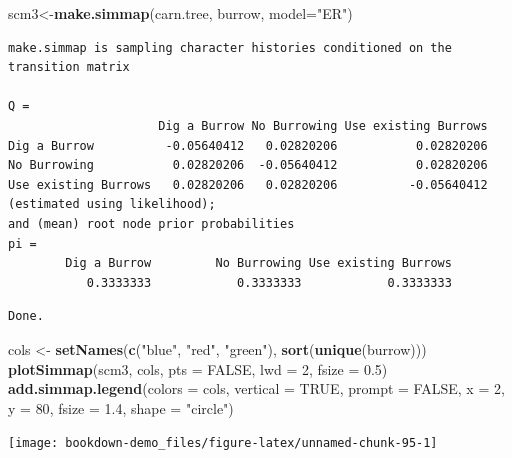 \documentclass[
]{book}
\newenvironment{Shaded}{\begin{snugshade}}{\end{snugshade}}
\newcommand{\DataTypeTok}[1]{\textcolor[rgb]{0.13,0.29,0.53}{#1}}
\newcommand{\DecValTok}[1]{\textcolor[rgb]{0.00,0.00,0.81}{#1}}
\newcommand{\FloatTok}[1]{\textcolor[rgb]{0.00,0.00,0.81}{#1}}
\newcommand{\KeywordTok}[1]{\textcolor[rgb]{0.13,0.29,0.53}{\textbf{#1}}}
\newcommand{\NormalTok}[1]{#1}
\newcommand{\OtherTok}[1]{\textcolor[rgb]{0.56,0.35,0.01}{#1}}
\newcommand{\StringTok}[1]{\textcolor[rgb]{0.31,0.60,0.02}{#1}}
\begin{document}
\begin{Shaded}
\begin{Highlighting}[]
\NormalTok{scm3\textless{}{-}}\KeywordTok{make.simmap}\NormalTok{(carn.tree, burrow, }\DataTypeTok{model=}\StringTok{"ER"}\NormalTok{)}
\end{Highlighting}
\end{Shaded}

\begin{verbatim}
make.simmap is sampling character histories conditioned on the transition matrix

Q =
                     Dig a Burrow No Burrowing Use existing Burrows
Dig a Burrow          -0.05640412   0.02820206           0.02820206
No Burrowing           0.02820206  -0.05640412           0.02820206
Use existing Burrows   0.02820206   0.02820206          -0.05640412
(estimated using likelihood);
and (mean) root node prior probabilities
pi =
        Dig a Burrow         No Burrowing Use existing Burrows 
           0.3333333            0.3333333            0.3333333 
\end{verbatim}

\begin{verbatim}
Done.
\end{verbatim}

\begin{Shaded}
\begin{Highlighting}[]
\NormalTok{cols \textless{}{-}}\StringTok{ }\KeywordTok{setNames}\NormalTok{(}\KeywordTok{c}\NormalTok{(}\StringTok{"blue"}\NormalTok{, }\StringTok{"red"}\NormalTok{, }\StringTok{"green"}\NormalTok{), }\KeywordTok{sort}\NormalTok{(}\KeywordTok{unique}\NormalTok{(burrow)))}
\KeywordTok{plotSimmap}\NormalTok{(scm3, cols, }\DataTypeTok{pts =} \OtherTok{FALSE}\NormalTok{, }\DataTypeTok{lwd =} \DecValTok{2}\NormalTok{, }\DataTypeTok{fsize =} \FloatTok{0.5}\NormalTok{)}
\KeywordTok{add.simmap.legend}\NormalTok{(}\DataTypeTok{colors =}\NormalTok{ cols, }\DataTypeTok{vertical =} \OtherTok{TRUE}\NormalTok{, }\DataTypeTok{prompt =} \OtherTok{FALSE}\NormalTok{, }\DataTypeTok{x =} \DecValTok{2}\NormalTok{, }\DataTypeTok{y =} \DecValTok{80}\NormalTok{, }\DataTypeTok{fsize =} \FloatTok{1.4}\NormalTok{, }\DataTypeTok{shape =} \StringTok{"circle"}\NormalTok{)}
\end{Highlighting}
\end{Shaded}

\begin{center}\texttt{[image: bookdown-demo\_files/figure-latex/unnamed-chunk-95-1]} \end{center}
\end{document}
